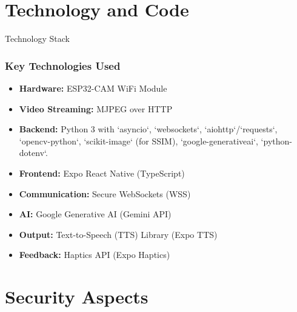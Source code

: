 \documentclass{beamer}
\begin{document}
\section{Technology and Code}

\begin{frame}{Technology Stack}
    \frametitle{Key Technologies Used}
    \begin{itemize}
        \item \textbf{Hardware:} ESP32-CAM WiFi Module
        \item \textbf{Video Streaming:} MJPEG over HTTP
        \item \textbf{Backend:} Python 3 with `asyncio`, `websockets`, `aiohttp`/`requests`, `opencv-python`, `scikit-image` (for SSIM), `google-generativeai`, `python-dotenv`.
        \item \textbf{Frontend:} Expo React Native (TypeScript)
        \item \textbf{Communication:} Secure WebSockets (WSS)
        \item \textbf{AI:} Google Generative AI (Gemini API)
        \item \textbf{Output:} Text-to-Speech (TTS) Library (Expo TTS)
        \item \textbf{Feedback:} Haptics API (Expo Haptics)
    \end{itemize}
\end{frame}


\section{Security Aspects}
\end{document}
